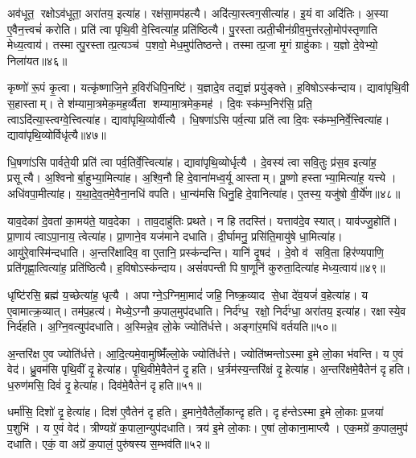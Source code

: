 अव॑धूत॒ रक्षोऽव॑धूता॒ अरा॑तय॒ इत्या॑ह।
रक्ष॑सा॒मप॑हत्यै।
अदि॑त्या॒स्त्वग॒सीत्या॑ह।
इ॒यं वा अदि॑तिः।
अ॒स्या ए॒वैन॒त्त्वचं॑ करोति।
प्रति॑ त्वा पृथि॒वी वे॒त्त्वित्या॑ह॒ प्रति॑ष्ठित्यै।
पु॒रस्तात्प्रती॒चीन॑ग्रीव॒मुत्त॑रलो॒मोप॑स्तृणाति मेध्य॒त्वाय॑।
तस्मात्पु॒रस्तात्प्र॒त्यञ्च॑ प॒शवो॒ मेध॒मुप॑तिष्ठन्ते।
तस्मात्प्र॒जा मृ॒गं ग्राहु॑काः।
य॒ज्ञो दे॒वेभ्यो॒ निला॑यत॥४६॥

कृष्णो॑ रू॒पं कृ॒त्वा।
यत्कृ॑ष्णाजि॒ने ह॒विर॑धिपि॒नष्टि॑।
य॒ज्ञादे॒व तद्य॒ज्ञं प्रयु॑ङ्क्ते।
ह॒विषोऽस्क॑न्दाय।
द्यावा॑पृथि॒वी स॒हास्ताम्।
ते श॑म्यामा॒त्रमेक॒मह॒र्व्यैता शम्यामा॒त्रमेक॒मह॑।
दि॒वः स्क॑म्भ॒निर॑सि॒ प्रति॒ त्वाऽदि॑त्या॒स्त्वग्वे॒त्त्वित्या॑ह।
द्यावा॑पृथि॒व्योर्वीत्यै।
धि॒षणा॑ऽसि पर्व॒त्या प्रति॑ त्वा दि॒वः स्क॑म्भ॒निर्वे॒त्त्वित्या॑ह।
द्यावा॑पृथि॒व्योर्विधृ॑त्यै॥४७॥

धि॒षणा॑ऽसि पार्वते॒यी प्रति॑ त्वा पर्व॒तिर्वे॒त्त्वित्या॑ह।
द्यावा॑पृथि॒व्योर्धृत्यै।
दे॒वस्य॑ त्वा सवि॒तुः प्र॑स॒व इत्या॑ह॒ प्रसूत्यै।
अ॒श्विनोर्बा॒हुभ्या॒मित्या॑ह।
अ॒श्वि॒नौ हि दे॒वाना॑मध्व॒र्यू आस्ताम्।
पू॒ष्णो हस्ताभ्या॒मित्या॑ह॒ यत्त्ये।
अधि॑वपा॒मीत्या॑ह।
य॒था॒दे॒व॒तमे॒वैना॒नधि॑ वपति।
धा॒न्य॑मसि धिनु॒हि दे॒वानित्या॑ह।
ए॒तस्य॒ यजु॑षो वी॒र्ये॑ण॥४८॥

याव॒देका॑ दे॒वता॑ का॒मय॑ते॒ याव॒देका।
ताव॒दाहु॑तिः प्रथते।
न हि तदस्ति॑।
यत्ताव॑दे॒व स्यात्।
याव॑ज्जु॒होति॑।
प्रा॒णाय॑ त्वाऽपा॒नाय॒ त्वेत्या॑ह।
प्रा॒णाने॒व यज॑माने दधाति।
दी॒र्घामनु॒ प्रसि॑ति॒मायु॑षे धा॒मित्या॑ह।
आयु॑रे॒वास्मि॑न्दधाति।
अ॒न्तरि॑क्षादिव॒ वा ए॒तानि॒ प्रस्क॑न्दन्ति।
यानि॑ दृ॒षद॑।
दे॒वो व॑ सवि॒ता हिर॑ण्यपाणि॒ प्रति॑गृह्णा॒त्वित्या॑ह॒ प्रति॑ष्ठित्यै।
ह॒विषोऽस्क॑न्दाय।
असं॑वपन्ती पिषा॒णूनि॑ कुरुता॒दित्या॑ह मेध्य॒त्वाय॑॥४९॥\anuvakamend[निला॑यत॒ विधृ॑त्यै वी॒र्ये॑ण स्कन्दन्ति च॒त्वारि॑ च]

धृष्टि॑रसि॒ ब्रह्म॑ य॒च्छेत्या॑ह॒ धृत्यै।
अपाग्ने॒ऽग्निमा॒मादं॑ जहि॒ निष्क्र॒व्याद से॒धा दे॑व॒यजं॑ व॒हेत्या॑ह।
य ए॒वामात्क्र॒व्यात्।
तम॑प॒हत्य॑।
मेध्ये॒ऽग्नौ क॒पाल॒मुप॑दधाति।
निर्द॑ग्ध॒ रक्षो॒ निर्द॑ग्धा॒ अरा॑तय॒ इत्या॑ह।
रक्षास्ये॒व निर्द॑हति।
अ॒ग्नि॒वत्युप॑दधाति।
अ॒स्मिन्ने॒व लो॒के ज्योति॑र्धत्ते।
अङ्गा॑र॒मधि॑ वर्तयति॥५०॥

अ॒न्तरि॑क्ष ए॒व ज्योति॑र्धत्ते।
आ॒दि॒त्यमे॒वामुष्मिँ॑ल्लो॒के ज्योति॑र्धत्ते।
ज्योति॑ष्मन्तोऽस्मा इ॒मे लो॒का भ॑वन्ति।
य ए॒वं वेद॑।
ध्रु॒वम॑सि पृथि॒वीं दृ॒हेत्या॑ह।
पृ॒थि॒वीमे॒वैतेन॑ दृ॒हति।
ध॒र्त्रम॑स्य॒न्तरि॑क्षं दृ॒हेत्या॑ह।
अ॒न्तरि॑क्षमे॒वैतेन॑ दृहति।
ध॒रुण॑मसि॒ दिवं॑ दृ॒हेत्या॑ह।
दिव॑मे॒वैतेन॑ दृहति॥५१॥

धर्मा॑सि॒ दिशो॑ दृ॒हेत्या॑ह।
दिश॑ ए॒वैतेन॑ दृहति।
इ॒माने॒वैतैर्लो॒कान्दृहति।
दृह॑न्तेऽस्मा इ॒मे लो॒काः प्र॒जया॑ प॒शुभि॑।
य ए॒वं वेद॑।
त्रीण्यग्रे॑ क॒पाला॒न्युप॑दधाति।
त्रय॑ इ॒मे लो॒काः।
ए॒षां लो॒काना॒माप्त्यै।
एक॒मग्रे॑ क॒पाल॒मुप॑ दधाति।
एकं॒ वा अग्रे॑ क॒पालं॒ पुरु॑षस्य स॒म्भव॑ति॥५२॥

